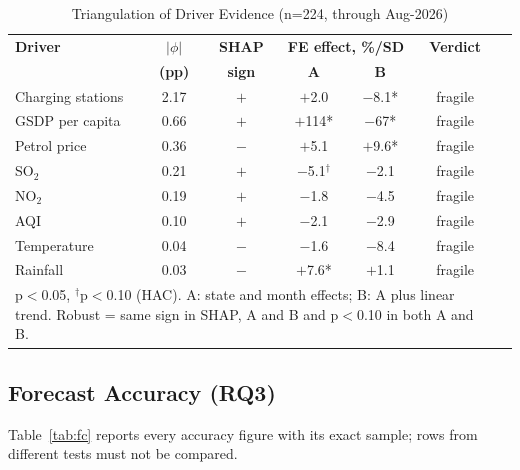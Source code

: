 \begin{table}[!t]
\caption{Triangulation of Driver Evidence (n=224, through Aug-2026)}\label{tab:drivers}
\centering\footnotesize
\setlength{\tabcolsep}{3pt}
\begin{tabular}{lcccccc}
\toprule
\textbf{Driver} & \textbf{$|\phi|$} & \textbf{SHAP} & \multicolumn{2}{c}{\textbf{FE effect, \%/SD}} & \textbf{Verdict}\\
 & \textbf{(pp)} & \textbf{sign} & \textbf{A} & \textbf{B} & \\
\midrule
Charging stations & 2.17 & $+$ & $+$2.0 & $-$8.1* & fragile\\
GSDP per capita & 0.66 & $+$ & $+$114* & $-$67* & fragile\\
Petrol price & 0.36 & $-$ & $+$5.1 & $+$9.6* & fragile\\
SO$_2$ & 0.21 & $+$ & $-$5.1$^{\dagger}$ & $-$2.1 & fragile\\
NO$_2$ & 0.19 & $+$ & $-$1.8 & $-$4.5 & fragile\\
AQI & 0.10 & $+$ & $-$2.1 & $-$2.9 & fragile\\
Temperature & 0.04 & $-$ & $-$1.6 & $-$8.4 & fragile\\
Rainfall & 0.03 & $-$ & $+$7.6* & $+$1.1 & fragile\\
\bottomrule
\multicolumn{6}{p{8.0cm}}{\scriptsize *p$<$0.05, $^{\dagger}$p$<$0.10 (HAC). A: state and month effects; B: A plus linear trend. Robust = same sign in SHAP, A and B and p$<$0.10 in both A and B.}\\
\end{tabular}
\end{table}

\subsection{Forecast Accuracy (RQ3)}
Table~\ref{tab:fc} reports every accuracy figure with its exact sample; rows from different tests must not be compared.

